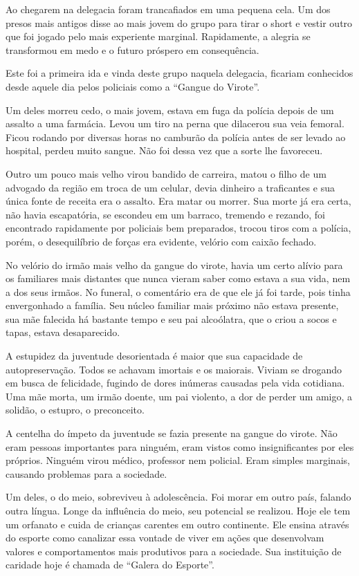 \documentclass[a4paper,14pt]{book}
\begin{document}
Ao chegarem na delegacia foram trancafiados em uma pequena cela. Um dos presos mais antigos disse ao mais jovem do grupo para tirar o short e vestir outro que foi jogado pelo mais experiente marginal. Rapidamente, a alegria se transformou em medo e o futuro próspero em consequência.

Este foi a primeira ida e vinda deste grupo naquela delegacia, ficariam conhecidos desde aquele dia pelos policiais como a “Gangue do Virote”.

Um deles morreu cedo, o mais jovem, estava em fuga da polícia depois de um assalto a uma farmácia. Levou um tiro na perna que dilacerou sua veia femoral. Ficou rodando por diversas horas no camburão da polícia antes de ser levado ao hospital, perdeu muito sangue. Não foi dessa vez que a sorte lhe favoreceu.

Outro um pouco mais velho virou bandido de carreira, matou o filho de um advogado da região em troca de um celular, devia dinheiro a traficantes e sua única fonte de receita era o assalto. Era matar ou morrer. Sua morte já era certa, não havia escapatória, se escondeu em um barraco, tremendo e rezando, foi encontrado rapidamente por policiais bem preparados, trocou tiros com a polícia, porém, o desequilíbrio de forças era evidente, velório com caixão fechado.

No velório do irmão mais velho da gangue do virote, havia um certo alívio para os familiares mais distantes que nunca vieram saber como estava a sua vida, nem a dos seus irmãos. No funeral, o comentário era de que ele já foi tarde, pois tinha envergonhado a família. Seu núcleo familiar mais próximo não estava presente, sua mãe falecida há bastante tempo e seu pai alcoólatra, que o criou a socos e tapas, estava desaparecido.

A estupidez da juventude desorientada é maior que sua capacidade de autopreservação. Todos se achavam imortais e os maiorais. Viviam se drogando em busca de felicidade, fugindo de dores inúmeras causadas pela vida cotidiana. Uma mãe morta, um irmão doente, um pai violento, a dor de perder um amigo, a solidão, o estupro, o preconceito.

A centelha do ímpeto da juventude se fazia presente na gangue do virote. Não eram pessoas importantes para ninguém, eram vistos como insignificantes por eles próprios. Ninguém virou médico, professor nem policial. Eram simples marginais, causando problemas para a sociedade.

Um deles, o do meio, sobreviveu à adolescência. Foi morar em outro país, falando outra língua. Longe da influência do meio, seu potencial se realizou. Hoje ele tem um orfanato e cuida de crianças carentes em outro continente. Ele ensina através do esporte como canalizar essa vontade de viver em ações que desenvolvam valores e comportamentos mais produtivos para a sociedade. Sua instituição de caridade hoje é chamada de “Galera do Esporte”.
\end{document}
